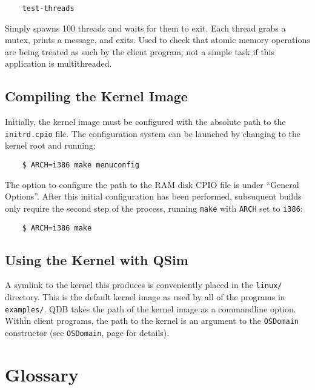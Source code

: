 \documentclass[letterpaper, 10pt]{book}
\begin{document}
\begin{verbatim}
    test-threads
\end{verbatim}
Simply spawns 100 threads and waits for them to exit. Each thread grabs a
mutex, prints a message, and exits. Used to check that atomic memory operations
are being treated as such by the client program; not a simple task if this
application is multithreaded.

\section{Compiling the Kernel Image}

Initially, the kernel image must be configured with the absolute path to the
\texttt{initrd.cpio} file. The configuration system can be launched by changing
to the kernel root and running:

\begin{verbatim}
    $ ARCH=i386 make menuconfig
\end{verbatim}

The option to configure the path to the RAM disk CPIO file is under ``General
Options''. After this initial configuration has been performed, subsuquent
builds only require the second step of the process, running \texttt{make} with
\texttt{ARCH} set to \texttt{i386}:

\begin{verbatim}
    $ ARCH=i386 make
\end{verbatim}

\section{Using the Kernel with QSim}
A symlink to the kernel this produces is conveniently placed in the
\texttt{linux/} directory. This is the default kernel image as used by all of
the programs in \texttt{examples/}. QDB takes the path of the kernel image as a
commandline option. Within client programs, the path to the kernel is an
argument to the \texttt{OSDomain} constructor (see \texttt{OSDomain}, page 
\pageref{class:OSDomain} for details).

\chapter*{Glossary}
\end{document}
